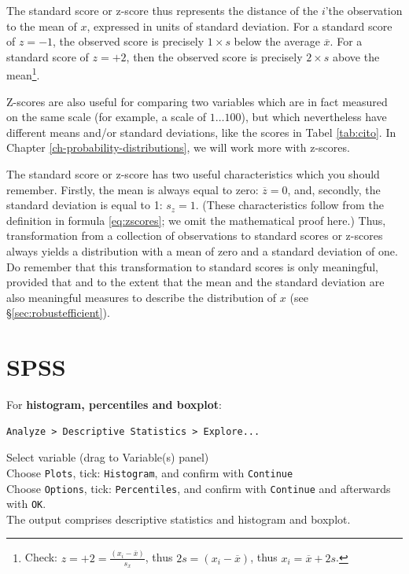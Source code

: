 \documentclass[
]{book}
\begin{document}
The standard score or z-score
thus represents the distance of the \(i\)'the observation to the mean
of \(x\), expressed in units of standard deviation. For a
standard score of \(z=-1\), the observed score is precisely \(1 \times s\)
below the average \(\overline{x}\). For a standard score of \(z=+2\),
then the observed score is precisely \(2 \times s\) above the
mean\footnote{Check: \(z = +2 = \frac{(x_i-\overline{x})}{s_x}\), thus \(2 s = (x_i-\overline{x})\), thus \(x_i = \overline{x}+2s\).}.

Z-scores are also useful for comparing two variables which
are in fact measured on the same scale (for example, a scale of
\(1 \dots 100\)), but which nevertheless have different means and/or
standard deviations, like the scores in
Tabel \ref{tab:cito}.
In Chapter \ref{ch-probability-distributions}, we will work more with z-scores.

The standard score or z-score has two useful characteristics which you
should remember. Firstly, the mean is always equal to zero:
\(\overline{z}=0\), and, secondly, the standard deviation is equal to 1:
\(s_z = 1\). (These characteristics follow from the definition in
formula \eqref{eq:zscores}; we omit the mathematical proof here.) Thus,
transformation from a collection of observations to
standard scores or z-scores always yields a distribution with
a mean of zero and a standard deviation of one. Do remember that
this transformation to standard scores is only meaningful, provided that and
to the extent that the mean and the standard deviation are also meaningful measures
to describe the distribution of \(x\) (see §\ref{sec:robustefficient}).

\hypertarget{spss-3}{%
\section{SPSS}\label{spss-3}}

For \textbf{histogram, percentiles and boxplot}:

\begin{verbatim}
Analyze > Descriptive Statistics > Explore...
\end{verbatim}

Select variable (drag to Variable(s) panel)\\
Choose \texttt{Plots}, tick: \texttt{Histogram}, and confirm with \texttt{Continue}\\
Choose \texttt{Options}, tick: \texttt{Percentiles}, and confirm with \texttt{Continue} and
afterwards with \texttt{OK}.\\
The output comprises descriptive statistics and histogram and
boxplot.
\end{document}
